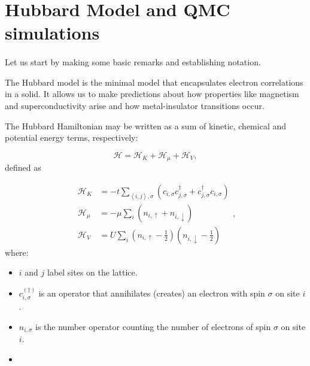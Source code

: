 \documentclass[10pt]{article}
\begin{document}
\section{Hubbard Model and QMC simulations}\paragraph{}

Let us start by making some basic remarks and establishing notation.

The Hubbard model is the minimal model that encapsulates electron correlations in a solid. It allows us to make predictions about how properties like magnetism and superconductivity arise and how metal-insulator transitions occur.

The Hubbard Hamiltonian may be written as a sum of kinetic, chemical and potential energy terms, respectively:

\begin{equation}\label{eq:hubbard}
\mathcal{H} = \mathcal{H}_K + \mathcal{H}_\mu + \mathcal{H}_V ,
\end{equation}
defined as

\begin{equation}\label{eq:def_energies}
\begin{split}
\mathcal{H}_K &= -t \sum_{\left\langle i, j \right \rangle, \sigma} ( c_{i,\sigma} c_{j,\sigma}^\dagger + c_{j,\sigma}^\dagger c_{i,\sigma} ) \\
\mathcal{H}_\mu &= -\mu \sum_i ( n_{i,\uparrow} + n_{i,\downarrow} ) \\
\mathcal{H}_V &= U \sum_{i} ( n_{i,\uparrow} - \frac{1}{2} ) ( n_{i,\downarrow} - \frac{1}{2} )
\end{split} ,
\end{equation}
where:

\begin{itemize}
\item $i$ and $j$ label sites on the lattice.
\item $c_{i,\sigma}^{(\dagger)}$ is an operator that annihilates (creates) an electron with spin $\sigma$ on site $i$.
\item $n_{i,\sigma}$ is the number operator counting the number of electrons of spin $\sigma$ on site $i$.
\item 
\end{itemize}
\end{document}
